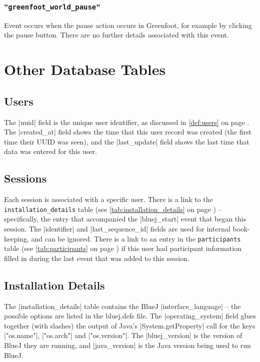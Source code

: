 \documentclass{report}
\newcommand{\myref}[1]{\autoref{#1} on page \pageref*{#1}}
\newcommand{\tabref}[1]{\lstinline|#1| table (see \myref{tab:#1})}
\newcommand{\intern}{This table may be interned, see \myref{def:intern}.}
\begin{document}
\subsection{\lstinline!"greenfoot_world_pause"!}

Event occurs when the pause action occurs in Greenfoot, for example
by clicking the pause button.
There are no further details associated with this event.

\chapter{Other Database Tables}
\label{sec:other_tables}

\section{Users}


The |uuid| field is the unique user identifier, as discussed in \myref{def:users}.
The |created_at| field shows the time that this user record was
created (the first time their UUID was seen), and the |last_update| field shows the last time that data was entered for
this user.

\section{Sessions}


Each session is associated with a specific user.  There is a link to
the \tabref{installation_details} -- specifically, the entry that
accompanied the |bluej_start| event that began this session.  The
|identifier| and |last_sequence_id| fields are used for internal
book-keeping, and can be ignored.  There is a link to an entry in the
\tabref{participants} if this user had participant information filled in
during the last event that was added to this session.

\section{Installation Details}


The |installation_details| table contains the BlueJ |interface_language| -- the
possible options are listed in the bluej.defs file.  The |operating_system|
field glues together (with slashes) the output of Java's |System.getProperty|
call for the keys |"os.name"|, |"os.arch"| and |"os.version"|.  The
|bluej_version| is the version of BlueJ they are running, and |java_version|
is the Java version being used to run BlueJ.
\end{document}
